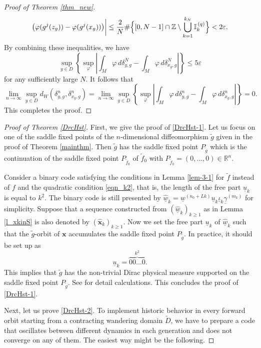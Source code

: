 \documentclass{amsart}
\theoremstyle{definition}
\numberwithin{equation}{section}
\numberwithin{figure}{section}
\begin{document}
\begin{proof}[Proof of Theorem \ref{thm_new}]
$$\bigr(\varphi(g^j(z_g))-\varphi(g^j(x_g))\bigr)\biggr|
\leq \frac2{N}\#\Bigl\{[0,N-1]\cap \mathbb{Z}\setminus \bigcup _{k=1}^{k_N} \mathbb{I}_k^{\,(q)}\Bigr\}<2\varepsilon.
$$
By combining these inequalities, we have 
$$\sup_{y\in D}\left\{\sup_{\varphi} \left|\int_M\varphi\,d\delta_{y,g}^N-\int_M\varphi\,d\delta_{x_g,g}^N\right|\right\}\leq 5\varepsilon$$
for any sufficiently large $N$.
It follows that 
$$\lim_{n\to \infty}\sup_{y\in D}d_W(\delta_{y,g}^n,\delta_{x_g,g}^n)=
\lim_{n\to \infty}\sup_{y\in D}\left\{\sup_{\varphi} \left|\int_M\varphi\,d\delta_{y,g}^n-\int_M\varphi\,d\delta_{x_g,g}^n\right|\right\}=0.$$
This completes the proof.
\end{proof}

\begin{proof}[Proof of Theorem \ref{DrcHst}]
First, we give the proof of  \eqref{DrcHst-1}.
Let us focus on one of the saddle fixed points of  the $n$-dimensional diffeomorphism $\widetilde{g}$ 
given in the proof of Theorem \ref{mainthm}.
Then $\widetilde{g}$ has the saddle fixed point $P_{\widetilde g}$ which is the continuation of 
the saddle fixed point $P_{\widetilde f_0}$ of $\widetilde f_0$ with $P_{\widetilde f_0}=(0,\dots,0)\in 
\mathbb{R}^n$.



Consider a binary code satisfying the conditions in Lemma \ref{lem-3-1} for $\widetilde f$ instead of $f$ 
and the quadratic condition \eqref{eqn_k2},
that is, 
the length of the free part $\underline{u}_{k}$ is equal to $k^{2}$.
The binary code is still presented by $\underline{\widehat{w}}_{k}
=\underline{w}^{(n_{0}+Lk)}\underline{u}_{k}\underline{\iota}_{k}\underline{\gamma}^{(m_{k})}$ for simplicity.
Suppose that a sequence   
constructed from $(\underline{\widehat{w}}_{k})_{k\geq 1}$ as in Lemma \ref{l_xkinS}
 is also denoted by $(\widehat{\boldsymbol{x}}_{k})_{k\geq 1}$.
Now we set the free part $\underline{u}_{k}$ of $\underline{\widehat{w}}_{k}$
 such that the $\widetilde g$-orbit of ${\boldsymbol x}$ accumulates the saddle fixed point $P_{\tilde{g}}$.
 In practice, it should be set up as 
 \[
\underline{u}_{k}=\overbrace{
00\dots 0}^{k^{2}}.
\]
This implies that  $\tilde{g}$  
 has the non-trivial Dirac physical measure supported on 
 the saddle fixed point  $P_{\tilde{g}}$. See \cite[Theorem 5.5]{KNS23} for detail calculations.
 This concludes the proof of \eqref{DrcHst-1}.
 \smallskip
 
 Next,  let us prove  \eqref{DrcHst-2}. To implement historic behavior in 
 every forward orbit starting from a contracting wandering domain $\widetilde{D}$, 
 we have to prepare a code that oscillates between different dynamics in each generation and does not converge on any of them. 
 The easiest way might be the following.
 

\end{proof}
\end{document}
